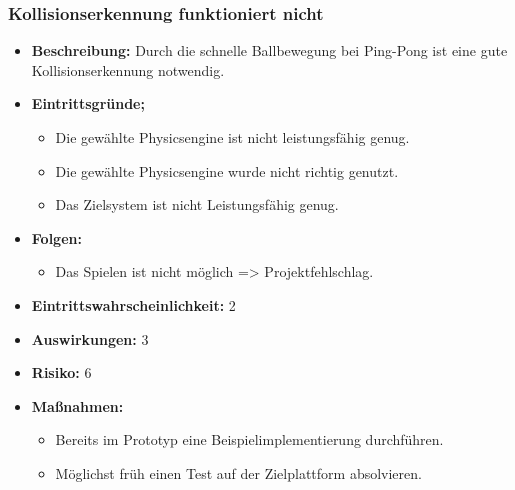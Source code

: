 \subsubsection{Kollisionserkennung funktioniert nicht}
\begin{itemize}
	\item \textbf{Beschreibung:} \newline
	Durch die schnelle Ballbewegung bei Ping-Pong ist eine gute Kollisionserkennung notwendig.
	\item \textbf{Eintrittsgründe;}
	\begin{itemize}
		\item Die gewählte Physicsengine ist nicht leistungsfähig genug.
		\item Die gewählte Physicsengine wurde nicht richtig genutzt.
		\item Das Zielsystem ist nicht Leistungsfähig genug.
	\end{itemize}
	\item \textbf{Folgen:}
	\begin{itemize}
		\item Das Spielen ist nicht möglich => Projektfehlschlag.
	\end{itemize}
	\item \textbf{Eintrittswahrscheinlichkeit:} 2
	\item \textbf{Auswirkungen:} 3
	\item \textbf{Risiko:} 6
	\item \textbf{Maßnahmen:}
	\begin{itemize}
		\item Bereits im Prototyp eine Beispielimplementierung durchführen.
		\item Möglichst früh einen Test auf der Zielplattform absolvieren.
	\end{itemize}
\end{itemize}
